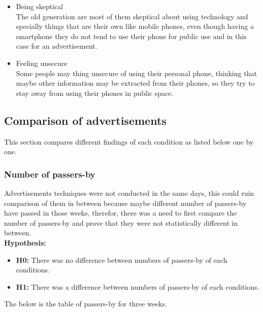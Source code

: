 \begin{enumerate}
\begin{itemize}
\item Being skeptical \\
The old generation are most of them skeptical about using technology and specially things that are their own like mobile phones, even though having a smartphone they do not tend to use their phone for public use and in this case for an advertisement. 

\item Feeling unsecure \\
Some people may thing unsecure of using their personal phone, thinking that maybe other information may be extracted from their phones, so they try to stay away from using their phones in public space. 

\fi

\end{itemize}

\end{enumerate}


\newpage
\subsection{Comparison of advertisements}
This section compares different findings of each condition as listed below one by one. 

\subsubsection {Number of passers-by}
Advertisements techniques were not conducted in the same days, this could ruin comparison of them in between because maybe different number of passers-by have passed in those weeks, therefor, there was a need to first compare the number of passers-by and prove that they were not statistically different in between. \\

\textbf{Hypothesis:}
\begin{itemize}
\item \textbf{H0:} There was no difference between numbers of passers-by of each conditions.
\item \textbf{H1:} There was a difference between numbers of passers-by of each conditions.
\end{itemize}

The below is the table of passers-by for three weeks.

